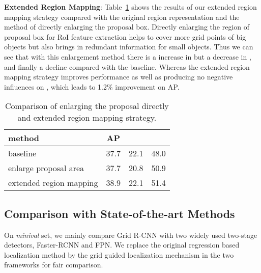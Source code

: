 \documentclass[10pt,twocolumn,letterpaper]{article}
\begin{document}
\textbf{Extended Region Mapping}: Table~\ref{tab:extend} shows the results of our extended region mapping strategy compared with the original region representation and the method of directly enlarging the proposal box. Directly enlarging the region of proposal box for RoI feature extraction helps to cover more grid points of big objects but also brings in redundant information for small objects. Thus we can see that with this enlargement method there is a increase in  but a decrease in , and finally a decline compared with the baseline. Whereas the extended region mapping strategy improves  performance as well as producing no negative influences on , which leads to 1.2\% improvement on AP. 
\begin{table}[t]
\begin{center}
\begin{tabular}{ l | c | c  c }
\hline
method & AP &  &  \\
\hline
baseline  & 37.7 & 22.1 & 48.0 \\
enlarge proposal area  & 37.7 & 20.8 & 50.9  \\
extended region mapping  & 38.9 & 22.1 & 51.4  \\
\hline
\end{tabular}
\vspace{1mm}
\caption{Comparison of enlarging the proposal directly and extended region mapping strategy.}
\label{tab:extend}
\vspace{-5mm}
\end{center}
\end{table}


\subsection{Comparison with State-of-the-art Methods}
On \textit{minival} set, we mainly compare Grid R-CNN with two widely used two-stage detectors, Faster-RCNN and FPN. We replace the original regression based localization method by the grid guided localization mechanism in the two frameworks for fair comparison. 
\end{document}
